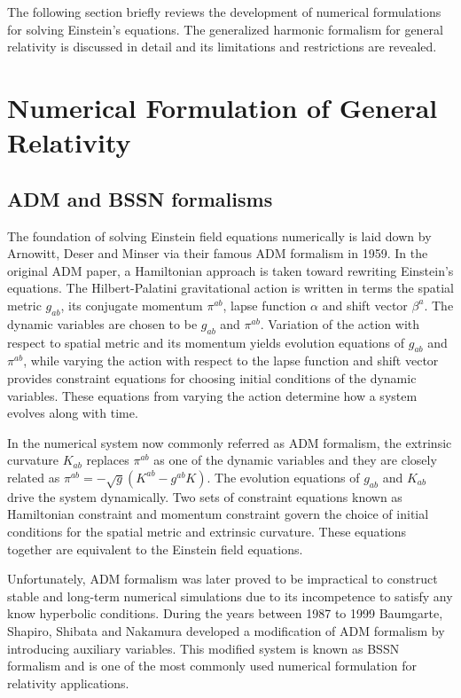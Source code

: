 The following section briefly reviews the development of numerical formulations for solving Einstein's equations. The generalized harmonic formalism for general relativity is discussed in detail and its limitations and restrictions are revealed. 
\section{Numerical Formulation of General Relativity}\label{numericalformulation}
\subsection{ADM and BSSN formalisms}
The foundation of solving Einstein field equations numerically is laid down by Arnowitt, Deser and Minser via their famous ADM formalism\cite{ADM:Witten} in 1959. In the original ADM paper, a Hamiltonian approach is taken toward rewriting Einstein's equations. The Hilbert-Palatini gravitational action is written in terms the spatial metric $g_{ab}$, its conjugate momentum $\pi^{ab}$, lapse function $\alpha$ and shift vector $\beta^{a}$. The dynamic variables are chosen to be $g_{ab}$ and $\pi^{ab}$. Variation of the action with respect to spatial metric and its momentum yields evolution equations of $g_{ab}$ and $\pi^{ab}$, while varying the action with respect to the lapse function and shift vector provides constraint equations for choosing initial conditions of the dynamic variables. These equations from varying the action determine how a system evolves along with time. 

In the numerical system now commonly referred as ADM formalism, the extrinsic curvature $K_{ab}$ replaces $\pi^{ab}$ as one of the dynamic variables and they are closely related as $\pi^{ab} = -\sqrt{g}(K^{ab} - g^{ab}K)$. The evolution equations of $g_{ab}$ and $K_{ab}$ drive the system dynamically. Two sets of constraint equations known as Hamiltonian constraint and momentum constraint govern the choice of initial conditions for the spatial metric and extrinsic curvature. These equations together are equivalent to the Einstein field equations. 

Unfortunately, ADM formalism was later proved to be impractical to construct stable and long-term numerical simulations due to its incompetence to satisfy any know hyperbolic conditions. During the years between 1987 to 1999 Baumgarte, Shapiro, Shibata and Nakamura\cite{Shibata:1995we, Baumgarte:1998te} developed a modification of ADM formalism by introducing auxiliary variables. This modified system is known as BSSN formalism and is one of the most commonly used numerical formulation for relativity applications. 

